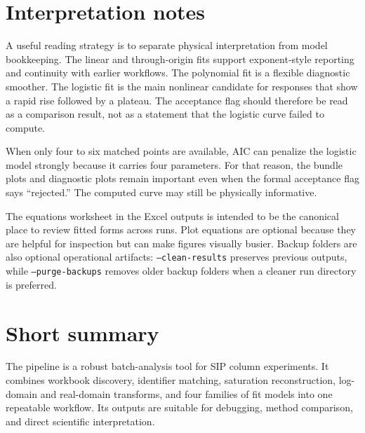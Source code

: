 \documentclass[11pt]{article}
\begin{document}
\section{Interpretation notes}
A useful reading strategy is to separate physical interpretation from model bookkeeping. The linear and through-origin fits support exponent-style reporting and continuity with earlier workflows. The polynomial fit is a flexible diagnostic smoother. The logistic fit is the main nonlinear candidate for responses that show a rapid rise followed by a plateau. The acceptance flag should therefore be read as a comparison result, not as a statement that the logistic curve failed to compute.

When only four to six matched points are available, AIC can penalize the logistic model strongly because it carries four parameters. For that reason, the bundle plots and diagnostic plots remain important even when the formal acceptance flag says ``rejected.'' The computed curve may still be physically informative.

The equations worksheet in the Excel outputs is intended to be the canonical place to review fitted forms across runs. Plot equations are optional because they are helpful for inspection but can make figures visually busier. Backup folders are also optional operational artifacts: \texttt{--clean-results} preserves previous outputs, while \texttt{--purge-backups} removes older backup folders when a cleaner run directory is preferred.

\section{Short summary}
The pipeline is a robust batch-analysis tool for SIP column experiments. It combines workbook discovery, identifier matching, saturation reconstruction, log-domain and real-domain transforms, and four families of fit models into one repeatable workflow. Its outputs are suitable for debugging, method comparison, and direct scientific interpretation.
\end{document}
